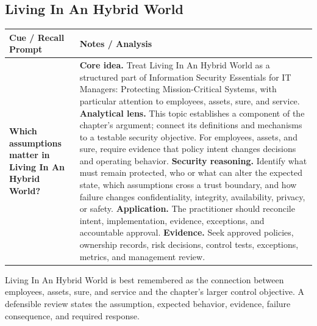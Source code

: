 \documentclass[11pt]{article}
\newcommand{\CornellHeader}{%
\rowcolor{Navy}\color{white}\bfseries Cue / Recall Prompt & \color{white}\bfseries Notes / Analysis\\\hline}
\newcommand{\CornellRow}[2]{%
\cellcolor{CueGray}\RaggedRight\textbf{#1} & \RaggedRight #2\\\hline}
\begin{document}
\subsection*{Living In An Hybrid World}
\begin{longtable}{>{\RaggedRight\arraybackslash}p{}|>{\RaggedRight\arraybackslash}p{}}
\CornellHeader
\CornellRow{Which assumptions matter in Living In An Hybrid World?}{\textbf{Core idea.} Treat Living In An Hybrid World as a structured part of Information Security Essentials for IT Managers: Protecting Mission-Critical Systems, with particular attention to employees, assets, sure, and service. \textbf{Analytical lens.} This topic establishes a component of the chapter's argument; connect its definitions and mechanisms to a testable security objective. For employees, assets, and sure, require evidence that policy intent changes decisions and operating behavior. \textbf{Security reasoning.} Identify what must remain protected, who or what can alter the expected state, which assumptions cross a trust boundary, and how failure changes confidentiality, integrity, availability, privacy, or safety. \textbf{Application.} The practitioner should reconcile intent, implementation, evidence, exceptions, and accountable approval. \textbf{Evidence.} Seek approved policies, ownership records, risk decisions, control tests, exceptions, metrics, and management review.}
\end{longtable}
\begin{topicsummary}
Living In An Hybrid World is best remembered as the connection between employees, assets, sure, and service and the chapter's larger control objective. A defensible review states the assumption, expected behavior, evidence, failure consequence, and required response.
\end{topicsummary}
\end{document}
